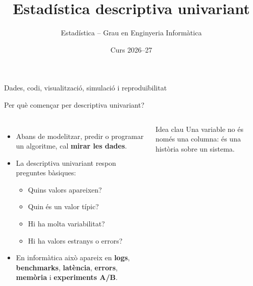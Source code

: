 \documentclass[10pt,aspectratio=169]{beamer}
\title[Descriptiva univariant computacional]{Estadística descriptiva univariant}
\author{Estadística -- Grau en Enginyeria Informàtica}
\date{Curs 2026--27}
\newcommand{\important}[1]{\textcolor{UABGreen}{\textbf{#1}}}
\newcommand{\exemple}[1]{\textcolor{AccentOrange}{\textbf{#1}}}
\begin{document}
\begin{frame}[plain]
  \titlepage
  \vspace{-0.5cm}
  \begin{center}
  \small
  \textcolor{DeepBlue}{Dades, codi, visualització, simulació i reproduïbilitat}
  \end{center}
\end{frame}

\begin{frame}{Per què començar per descriptiva univariant?}
\begin{columns}[T]
\begin{itemize}
  \item Abans de modelitzar, predir o programar un algoritme, cal \important{mirar les dades}.
  \item La descriptiva univariant respon preguntes bàsiques:
  \begin{itemize}
    \item Quins valors apareixen?
    \item Quin és un valor típic?
    \item Hi ha molta variabilitat?
    \item Hi ha valors estranys o errors?
  \end{itemize}
  \item En informàtica això apareix en \exemple{logs}, \exemple{benchmarks}, \exemple{latència}, \exemple{errors}, \exemple{memòria} i \exemple{experiments A/B}.
\end{itemize}

\begin{block}{Idea clau}
Una variable no és només una columna: és una història sobre un sistema.
\end{block}
\vspace{0.2cm}
\end{columns}
\end{frame}
\end{document}
